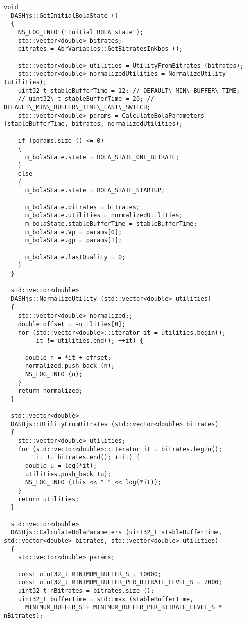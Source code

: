 \begin{lstlisting}[language=myC++, caption={DASHjs.cc}, captionpos=b]
  void
  DASHjs::GetInitialBolaState ()
  {
    NS_LOG_INFO ("Initial BOLA state");
    std::vector<double> bitrates;
    bitrates = AbrVariables::GetBitratesInKbps ();
  
    std::vector<double> utilities = UtilityFromBitrates (bitrates);
    std::vector<double> normalizedUtilities = NormalizeUtility (utilities);
    uint32_t stableBufferTime = 12; // DEFAULT\_MIN\_BUFFER\_TIME;
    // uint32\_t stableBufferTime = 20; // DEFAULT\_MIN\_BUFFER\_TIME\_FAST\_SWITCH;
    std::vector<double> params = CalculateBolaParameters (stableBufferTime, bitrates, normalizedUtilities);
  
    if (params.size () <= 0)
    {
      m_bolaState.state = BOLA_STATE_ONE_BITRATE;
    }
    else
    {
      m_bolaState.state = BOLA_STATE_STARTUP;
  
      m_bolaState.bitrates = bitrates;
      m_bolaState.utilities = normalizedUtilities;
      m_bolaState.stableBufferTime = stableBufferTime;
      m_bolaState.Vp = params[0];
      m_bolaState.gp = params[1];
  
      m_bolaState.lastQuality = 0;
    }
  }
  
  std::vector<double>
  DASHjs::NormalizeUtility (std::vector<double> utilities)
  {
    std::vector<double> normalized;;
    double offset = -utilities[0];
    for (std::vector<double>::iterator it = utilities.begin();
         it != utilities.end(); ++it) {
  
      double n = *it + offset;
      normalized.push_back (n);
      NS_LOG_INFO (n);
    }
    return normalized;
  }
  
  std::vector<double>
  DASHjs::UtilityFromBitrates (std::vector<double> bitrates)
  {
    std::vector<double> utilities;
    for (std::vector<double>::iterator it = bitrates.begin();
         it != bitrates.end(); ++it) {
      double u = log(*it);
      utilities.push_back (u);
      NS_LOG_INFO (this << " " << log(*it));
    }
    return utilities;
  }
  
  std::vector<double>
  DASHjs::CalculateBolaParameters (uint32_t stableBufferTime, std::vector<double> bitrates, std::vector<double> utilities)
  {
    std::vector<double> params;
  
    const uint32_t MINIMUM_BUFFER_S = 10000;
    const uint32_t MINIMUM_BUFFER_PER_BITRATE_LEVEL_S = 2000;
    uint32_t nBitrates = bitrates.size ();
    uint32_t bufferTime = std::max (stableBufferTime,
      MINIMUM_BUFFER_S + MINIMUM_BUFFER_PER_BITRATE_LEVEL_S * nBitrates);
  

\end{lstlisting}
